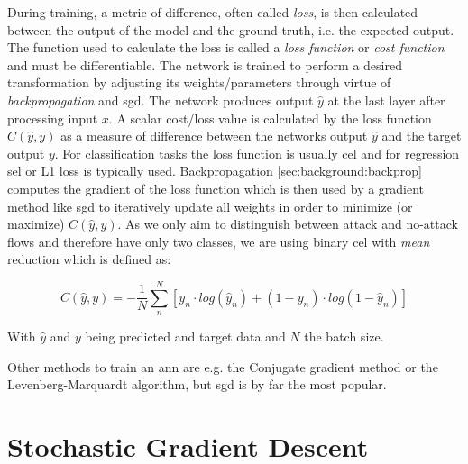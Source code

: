 

During training, a metric of difference, often called \textit{loss}, is then calculated between the output of the model and the ground truth, i.e. the expected output. The function used to calculate the loss is called a \textit{loss function} or \textit{cost function} and must be differentiable. The network is trained to perform a desired transformation by adjusting its weights/parameters through virtue of \textit{backpropagation} and \gls{sgd}. The network produces output $\hat{y}$ at the last layer after processing input $x$. A scalar cost/loss value is calculated by the loss function $C(\hat{y}, y)$ as a measure of difference between the networks output $\hat{y}$ and the target output $y$. For classification tasks the loss function is usually \gls{cel} and for regression \gls{sel} or L1 loss is typically used. Backpropagation \ref{sec:background:backprop} computes the gradient of the loss function which is then used by a gradient method like \gls{sgd} to iteratively update all weights in order to minimize (or maximize) $C(\hat{y}, y)$. As we only aim to distinguish between attack and no-attack flows and therefore have only two classes, we are using binary \gls{cel} with \textit{mean} reduction which is defined as:

\begin{equation}
C(\hat{y},y) = -\frac{1}{N}\sum_n^{N}[y_n \cdot log(\hat{y}_n) + (1-y_n) \cdot log(1-\hat{y}_n)]
\end{equation}

With $\hat{y}$ and $y$ being predicted and target data and $N$ the batch size.

Other methods to train an \gls{ann} are e.g. the Conjugate gradient method or the Levenberg-Marquardt algorithm, but \gls{sgd} is by far the most popular.

\section{Stochastic Gradient Descent} \label{sec:background:sgd}

